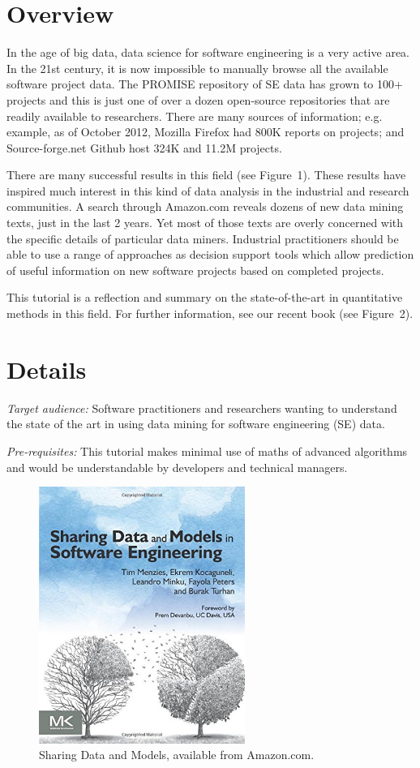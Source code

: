 \documentclass[conference]{IEEEtran}
\begin{document}
 \section{Overview}
 In the age of big data, data science for software engineering is a very active area.  In the 21st century, it is now impossible to manually browse all the available software project data. The PROMISE repository of SE data has grown to 100+ projects and this is just one of over a dozen open-source repositories that are readily available to researchers. There are many sources of information; e.g. example, as of October 2012, Mozilla Firefox had 800K reports on projects; and Source-forge.net Github host 324K and 11.2M projects.


There are many successful results in this field (see Figure~1).
       These results have inspired much interest in this kind of data analysis in the industrial and research communities. A search through Amazon.com reveals dozens of new data mining texts, just in the last 2 years.  Yet most of those texts are overly concerned with the specific details of particular data miners. Industrial practitioners should be able to use a range of approaches as decision support tools which allow prediction of useful information on new software projects based on completed projects. 
       
This tutorial is a reflection  and summary
on the state-of-the-art in quantitative methods in this  field. For further information, see our
recent book   (see Figure~2).

\section{Details}   
       
{\em  Target audience: }Software practitioners and researchers wanting to understand the state of the art in using data mining for software engineering (SE) data.  
 
{\em Pre-requisites:} This tutorial makes minimal use of maths of advanced algorithms and would be understandable by  developers and technical managers. 
 

\begin{figure}[!b]
\centering
\includegraphics[width=2.65in]{book.jpg}
\caption{Sharing Data and Models,
available from Amazon.com.}
\label{fig:book}
\end{figure}
 
\end{document}
